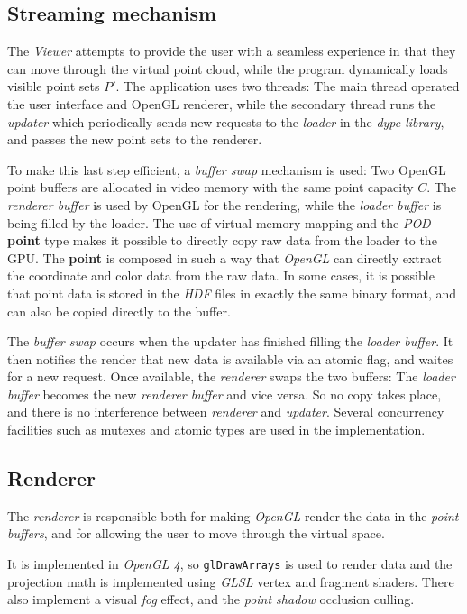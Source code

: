 \documentclass[a4paper,10pt,abstracton,notitlepage]{scrreprt}
\begin{document}
\subsection{Streaming mechanism}
The \emph{Viewer} attempts to provide the user with a seamless experience in that they can move through the virtual point cloud, while the program dynamically loads visible point sets $P'$. The application uses two threads: The main thread operated the user interface and OpenGL renderer, while the secondary thread runs the \emph{updater} which periodically sends new requests to the \emph{loader} in the \emph{dypc library}, and passes the new point sets to the renderer.

To make this last step efficient, a \emph{buffer swap} mechanism is used: Two OpenGL point buffers are allocated in video memory with the same point capacity $C$. The \emph{renderer buffer} is used by OpenGL for the rendering, while the \emph{loader buffer} is being filled by the loader. The use of virtual memory mapping and the \emph{POD} \textbf{point} type makes it possible to directly copy raw data from the loader to the GPU. The \textbf{point} is composed in such a way that \emph{OpenGL} can directly extract the coordinate and color data from the raw data. In some cases, it is possible that point data is stored in the \emph{HDF} files in exactly the same binary format, and can also be copied directly to the buffer.

The \emph{buffer swap} occurs when the updater has finished filling the \emph{loader buffer}. It then notifies the render that new data is available via an atomic flag, and waites for a new request. Once available, the \emph{renderer} swaps the two buffers: The \emph{loader buffer} becomes the new \emph{renderer buffer} and vice versa. So no copy takes place, and there is no interference between \emph{renderer} and \emph{updater}. Several concurrency facilities such as mutexes and atomic types are used in the implementation.

\subsection{Renderer}
The \emph{renderer} is responsible both for making \emph{OpenGL} render the data in the \emph{point buffers}, and for allowing the user to move through the virtual space.

It is implemented in \emph{OpenGL 4}, so \texttt{glDrawArrays} is used to render data and the projection math is implemented using \emph{GLSL} vertex and fragment shaders. There also implement a visual \emph{fog} effect, and the \emph{point shadow} occlusion culling.
\end{document}
